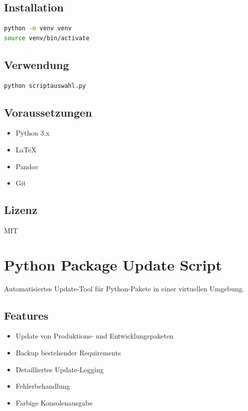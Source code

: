 \documentclass{content/vorlage-design-main}
\begin{document}
\subsection{Installation}\label{installation}

\begin{lstlisting}[language=bash]
python -m venv venv
source venv/bin/activate
\end{lstlisting}

\subsection{Verwendung}\label{verwendung}

\begin{lstlisting}[language=bash]
python scriptauswahl.py
\end{lstlisting}

\subsection{Voraussetzungen}\label{voraussetzungen}

\begin{itemize}

\item
  Python 3.x
\item
  LaTeX
\item
  Pandoc
\item
  Git
\end{itemize}

\subsection{Lizenz}\label{lizenz}

MIT

\section{Python Package Update
Script}\label{python-package-update-script}

Automatisiertes Update-Tool für Python-Pakete in einer virtuellen
Umgebung.

\subsection{Features}\label{features}

\begin{itemize}

\item
  Update von Produktions- und Entwicklungspaketen
\item
  Backup bestehender Requirements
\item
  Detailliertes Update-Logging
\item
  Fehlerbehandlung
\item
  Farbige Konsolenausgabe
\end{itemize}
\end{document}
